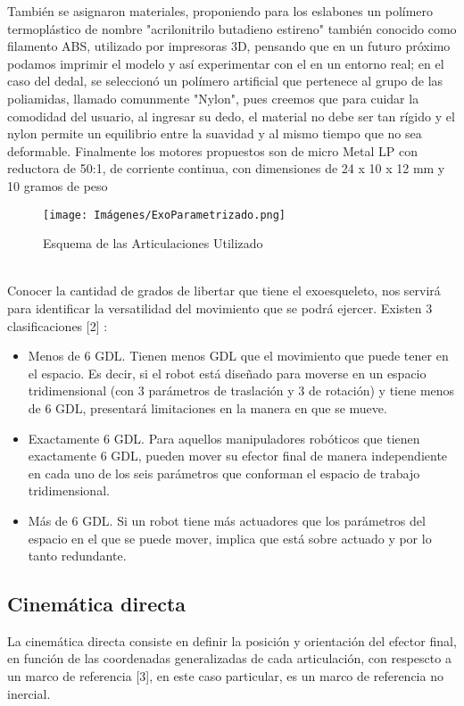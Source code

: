 \documentclass[journal, trans, spanish]{IEEEtran}
\begin{document}
También se asignaron materiales, proponiendo para los eslabones un polímero termoplástico de nombre "acrilonitrilo butadieno estireno" también conocido como filamento ABS, utilizado por impresoras 3D, pensando que en un futuro próximo podamos imprimir el modelo y así experimentar con el en un entorno real; en el caso del dedal, se seleccionó un polímero artificial que pertenece al grupo de las poliamidas, llamado comunmente "Nylon", pues creemos que para cuidar la comodidad del usuario, al ingresar su dedo, el material no debe ser tan rígido y el nylon permite un equilibrio entre la suavidad y al mismo tiempo que no sea deformable.
Finalmente los motores propuestos son de micro Metal LP con reductora de 50:1, de corriente continua, con dimensiones de 24 x 10 x 12 mm y 10 gramos de peso \\ 
\begin{figure} [h!]
         \centering
         \texttt{[image: Imágenes/ExoParametrizado.png]}
     \caption{Esquema de las Articulaciones Utilizado}
     \label{fig:ExoPara}
\end{figure}
\noindent  \\
Conocer la cantidad de grados de libertar que tiene el exoesqueleto, nos servirá para identificar la versatilidad del movimiento que se podrá ejercer. Existen 3 clasificaciones [2] :
\begin{itemize}
    \item Menos de 6 GDL. Tienen menos GDL que el movimiento que puede tener en el espacio. Es decir, si el robot está diseñado para moverse en un espacio tridimensional (con 3 parámetros de traslación y 3 de rotación) y tiene menos de 6 GDL, presentará  limitaciones en la manera en que se mueve. 
    \item Exactamente 6 GDL. Para aquellos manipuladores robóticos que tienen exactamente 6 GDL, pueden mover su efector final de manera independiente en cada uno de los seis parámetros que conforman el espacio de trabajo tridimensional.
    \item Más de 6 GDL. Si un robot tiene más actuadores que los parámetros del espacio en el que se puede mover, implica que está sobre actuado y por lo tanto redundante.
\end{itemize}

\subsection{Cinemática directa}

\noindent La cinemática directa consiste en definir la posición y orientación del efector final, en función de las coordenadas generalizadas de cada articulación, con respescto a un marco de referencia [3], en este caso particular, es un marco de referencia no inercial.
\end{document}
